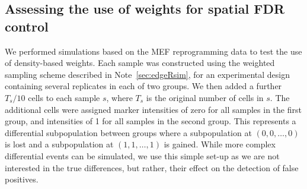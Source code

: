 \documentclass{article}
\begin{document}
%
%

\subsection{Assessing the use of weights for spatial FDR control}
We performed simulations based on the MEF reprogramming data to test the use of density-based weights.
Each sample was constructed using the weighted sampling scheme described in Note~\ref{sec:edgeRsim}, for an experimental design containing several replicates in each of two groups.
We then added a further $T_s/10$ cells to each sample $s$, where $T_s$ is the original number of cells in $s$.
The additional cells were assigned marker intensities of zero for all samples in the first group, and intensities of 1 for all samples in the second group.
This represents a differential subpopulation between groups where a subpopulation at $(0,0, \ldots, 0)$ is lost and a subpopulation at $(1, 1, \ldots, 1)$ is gained.
While more complex differential events can be simulated, we use this simple set-up as we are not interested in the true differences, but rather, their effect on the detection of false positives.
\end{document}
